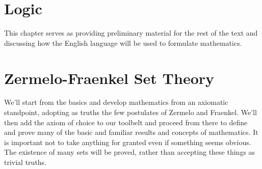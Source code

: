 \begingroup
    \ifcsname\PATH\endcsname
        \newcommand{\PATH}{books/Foundations/ZFC}
        \newcommand{\OLDPATH}{\PATH}
    \else
        \newcommand{\OLDPATH}{\PATH}
        \renewcommand{\PATH}{books/Foundations/ZFC}
    \fi
    \chapter{Logic}
        This chapter serves as providing preliminary material for the rest of
        the text and discussing how the English language will be used to
        formulate mathematics.
        
    \chapter{Zermelo-Fraenkel Set Theory}
        We'll start from the basics and develop mathematics from an axiomatic
        standpoint, adopting as truths the few postulates of Zermelo and
        Fraenkel. We'll then add the axiom of choice to our toolbelt and
        proceed from there to define and prove many of the basic and familiar
        results and concepts of mathematics. It is important not to take
        anything for granted even if something seems obvious. The existence of
        many sets will be proved, rather than accepting these things as trivial
        truths.
        
        
        

    \renewcommand{\PATH}{\OLDPATH}
\endgroup